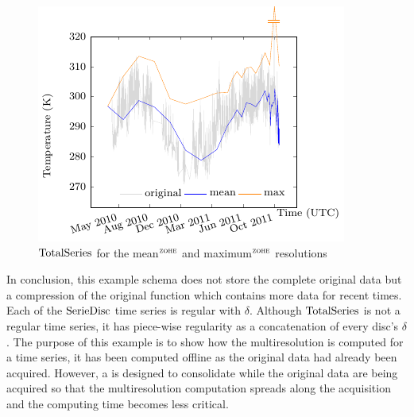 \begin{figure}[tp]
  \centering
  \includegraphics{fig_exemple_4mrdtot.pdf}
  \caption{$\operatorname{TotalSeries}$ for the mean$^{\zohe}$ and maximum$^{\zohe}$
    resolutions}
  \label{fig:exemple:4mrdtot}
\end{figure}


In conclusion, this  example schema does not store the
complete original data but a compression of the original function
which contains more data for recent times.  Each of the
$\operatorname{SerieDisc}$ time series is regular with $\delta$. Although
$\operatorname{TotalSeries}$ is not a regular time series, it has piece-wise
regularity as a concatenation of every disc's $\delta$.  The purpose
of this example is to show how the multiresolution is computed for a
time series, it has been computed offline as the original data had
already been acquired. However, a  is designed to
consolidate while the original data are being acquired so that the
multiresolution computation spreads along the acquisition and the
computing time becomes less critical.




